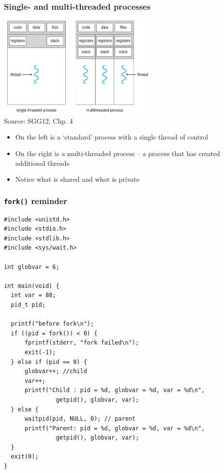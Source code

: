 \documentclass[hyperref={pdfpagelabels=false},svgnames]{beamer}
\begin{document}
\begin{frame}
  \frametitle{Single- and multi-threaded processes}
  \begin{center}
    \includegraphics[width=0.6\textwidth]{fig01} \\
    \tiny{Source: SGG12, Chp. 4}
  \end{center}
  \begin{itemize}
    \item On the left is a `standard' process with a 
      single thread of control
    \item On the right is a multi-threaded process --
      a process that has created additional threads
    \item Notice what is shared and what is private
  \end{itemize}
\end{frame}

\begin{frame}[fragile, shrink=10]
  \frametitle{\texttt{fork()} reminder}
  \begin{verbatim}
#include <unistd.h>
#include <stdio.h>
#include <stdlib.h>
#include <sys/wait.h>

int globvar = 6;

int main(void) {
  int var = 88;
  pid_t pid;

  printf("before fork\n");
  if ((pid = fork()) < 0) {
      fprintf(stderr, "fork failed\n");
      exit(-1);
  } else if (pid == 0) {
      globvar++; //child
      var++;
      printf("Child : pid = %d, globvar = %d, var = %d\n",
               getpid(), globvar, var);
  } else {
      waitpid(pid, NULL, 0); // parent
      printf("Parent: pid = %d, globvar = %d, var = %d\n",
               getpid(), globvar, var);
  }
  exit(0);
}
  \end{verbatim}
\end{frame}
\end{document}
